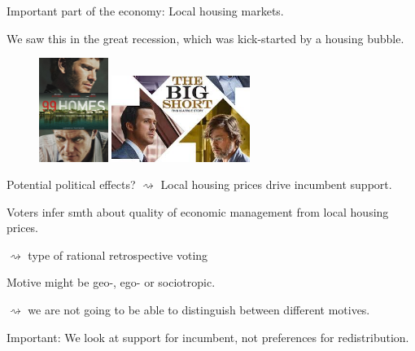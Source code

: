 \documentclass[aspectratio=169]{beamer}
\begin{document}
\begin{frame}
Important part of the economy: Local housing markets.

\vspace{0.1in} \pause

We saw this in the great recession, which was kick-started by a housing bubble.  \pause

\vspace{0.1in}
\begin{figure} \centering
\includegraphics[width=0.2\textwidth]{../../figures/99homes.jpg} \hspace{0.2in} \pause \includegraphics[width=0.4\textwidth]{../../figures/bigshort.jpg}
\end{figure}
\vspace{0.1in}
\pause	
	
Potential political effects? 
  \pause
$\rightsquigarrow$ Local housing prices drive incumbent support.
\end{frame}

\begin{frame}
Voters infer smth about quality of economic management from local housing prices. \pause

	
$\rightsquigarrow$ type of rational retrospective voting

\vspace{0.2in} \pause
	
Motive might be geo-, ego- or sociotropic. \pause

$\rightsquigarrow$ we are not going to be able to distinguish between  different motives. \pause
\vspace{0.2in}
	
Important: We look at support for incumbent, not preferences for redistribution.  	
\end{frame}
\end{document}
